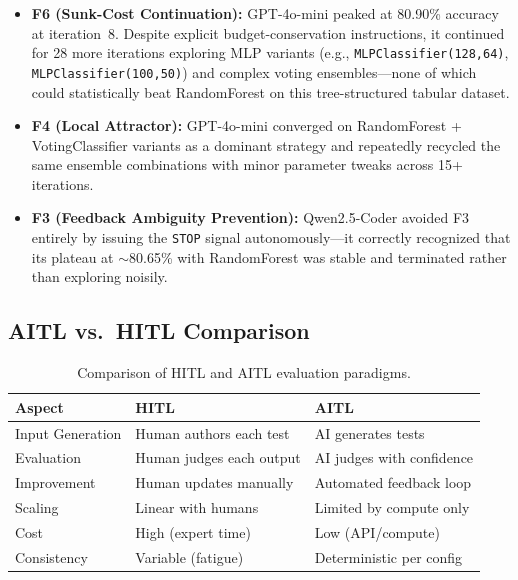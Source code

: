 \documentclass[11pt]{article}
\begin{document}
\begin{itemize}[nosep]
  \item \textbf{F6 (Sunk-Cost Continuation):} GPT-4o-mini peaked at 80.90\% accuracy at iteration~8. Despite explicit budget-conservation instructions, it continued for 28 more iterations exploring MLP variants (e.g., \texttt{MLPClassifier(128,64)}, \texttt{MLPClassifier(100,50)}) and complex voting ensembles---none of which could statistically beat RandomForest on this tree-structured tabular dataset.
  \item \textbf{F4 (Local Attractor):} GPT-4o-mini converged on RandomForest + VotingClassifier variants as a dominant strategy and repeatedly recycled the same ensemble combinations with minor parameter tweaks across 15+ iterations.
  \item \textbf{F3 (Feedback Ambiguity Prevention):} Qwen2.5-Coder avoided F3 entirely by issuing the \texttt{STOP} signal autonomously---it correctly recognized that its plateau at $\sim$80.65\% with RandomForest was stable and terminated rather than exploring noisily.
\end{itemize}

\subsection{AITL vs.\ HITL Comparison}

\begin{table}[t]
  \centering
  \caption{Comparison of HITL and AITL evaluation paradigms.}
  \label{tab:hitl_aitl}
  \small
  \begin{tabular}{@{}lll@{}}
    \toprule
    \textbf{Aspect} & \textbf{HITL} & \textbf{AITL} \\
    \midrule
    Input Generation & Human authors each test & AI generates tests \\
    Evaluation & Human judges each output & AI judges with confidence \\
    Improvement & Human updates manually & Automated feedback loop \\
    Scaling & Linear with humans & Limited by compute only \\
    Cost & High (expert time) & Low (API/compute) \\
    Consistency & Variable (fatigue) & Deterministic per config \\
    \bottomrule
  \end{tabular}
\end{table}

\end{document}
